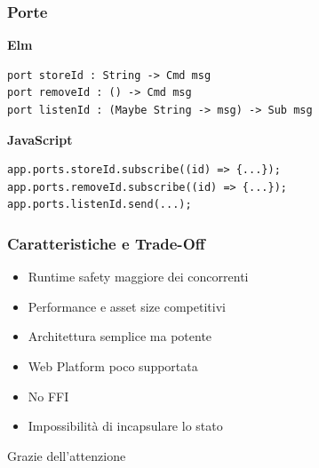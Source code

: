 \documentclass{beamer}
\begin{document}
\begin{frame}[containsverbatim]
  \frametitle{Porte}
  \textbf{Elm}
  \begin{verbatim}
port storeId : String -> Cmd msg
port removeId : () -> Cmd msg
port listenId : (Maybe String -> msg) -> Sub msg
  \end{verbatim}
  \vspace{10pt}
  \textbf{JavaScript}
  \begin{verbatim}
app.ports.storeId.subscribe((id) => {...});
app.ports.removeId.subscribe((id) => {...});
app.ports.listenId.send(...);
  \end{verbatim}
\end{frame}

\begin{frame}
  \frametitle{Caratteristiche e Trade-Off}
  \begin{itemize}
    \item Runtime safety maggiore dei concorrenti
    \item Performance e asset size competitivi
    \item Architettura semplice ma potente
    \item Web Platform poco supportata
    \item No FFI
    \item Impossibilità di incapsulare lo stato
  \end{itemize}
\end{frame}

\begin{frame}[plain]
  \vfill
  \centering
  \Huge Grazie dell'attenzione
  \vfill
\end{frame}
\end{document}
